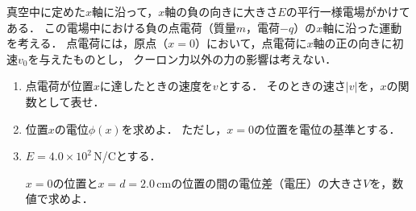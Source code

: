 \documentclass[../../../all/physics-standard_questions_all.tex]{subfiles}
\begin{document}
真空中に定めた$x$軸に沿って，$x$軸の負の向きに大きさ$E$の平行一様電場がかけてある．
この電場中における負の点電荷（質量$m$，電荷$-q$）の$x$軸に沿った運動を考える．
点電荷には，原点（$x=0$）において，点電荷に$x$軸の正の向きに初速$v_0$を与えたものとし，
クーロン力以外の力の影響は考えない．

\begin{enumerate}

    \item 点電荷が位置$x$に達したときの速度を$v$とする．
    そのときの速さ$|v|$を，$x$の関数として表せ．

    \item 位置$x$の電位$\phi(x)$を求めよ．
    ただし，$x=0$の位置を電位の基準とする．

    \item $E=4.0 \times 10^2$\,N/Cとする．\par    
    $x=0$の位置と$x=d=2.0$\,cmの位置の間の電位差（電圧）の大きさ$V$を，数値で求めよ．

\end{enumerate}
\end{document}
